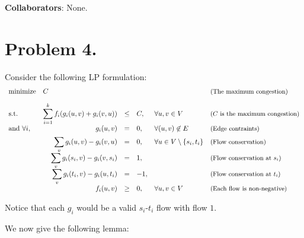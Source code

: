 \documentclass[12pt, a4paper]{article}
\begin{document}
{\bf Collaborators}: None.

\section{Problem 4.}

Consider the following LP formulation:
\begin{equation} \label{eq:ilp}
  \begin{array}{>{\displaystyle}l>{\displaystyle}r>{\displaystyle}c*3{>{\displaystyle}l}}
    \text{minimize} & \multicolumn{4}{l}{C} & \text{\small (The maximum congestion)}\\[10pt]
    \text{s.t.} & \sum_{i = 1}^k f_i (g_i(u, v) + g_i(v, u)) & \leq & C, & \forall u, v \in V &
    \text{\small ($C$ is the maximum congestion)} \\[5pt]

    \text{and } \forall i, & g_i(u, v) & = & 0, & \forall (u, v) \not\in E & \text{\small (Edge contraints)} \\[5pt]

    & \sum_v g_i(u, v) - g_i(v, u) & = & 0, & \forall u \in V \setminus \{s_i, t_i\} & \text{\small (Flow conservation)} \\[5pt]

    & \sum_v g_i(s_i, v) - g_i(v, s_i) & = & 1, &  & \text{\small (Flow conservation at $s_i$)} \\[5pt]
    & \sum_v g_i(t_i, v) - g_i(u, t_i) & = & -1, &  & \text{\small (Flow conservation at $t_i$)} \\[5pt]
    & f_i(u, v) & \geq & 0, & \forall u, v \in V & \text{\small (Each flow is non-negative)}
  \end{array}
\end{equation}

Notice that each $g_i$ would be a valid $s_i$-$t_i$ flow with flow $1$.

We now give the following lemma:
\end{document}
